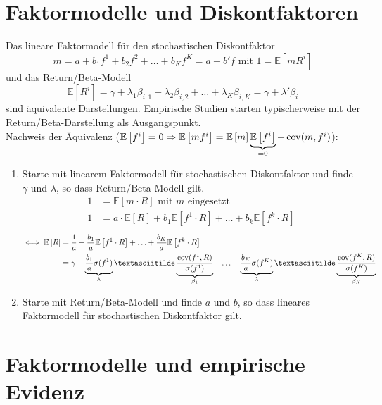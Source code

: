 \documentclass[12pt]{extreport} %
\theoremstyle{named}
\theoremstyle{nnamed}
\theoremstyle{itshape}
\theoremstyle{normal}
\begin{document}
\section{Faktormodelle und Diskontfaktoren}

Das lineare Faktormodell für den stochastischen Diskontfaktor
	$$ m = a + b_1 f^1 + b_2 f^2 + \dotsc + b_K f^K = a + b'f \text{ mit } 1 = \mathbb{E}[m R^i] $$
und das Return/Beta-Modell
	$$ \mathbb{E}[R^i] = \gamma + \lambda_1 \beta_{i, 1} + \lambda_2 \beta_{i, 2} + \dotsc + \lambda_K \beta_{i, K} = \gamma + \lambda' \beta_i $$
sind äquivalente Darstellungen. Empirische Studien starten typischerweise mit der Return/Beta-Darstellung als Ausgangspunkt. ~\\

Nachweis der Äquivalenz ($\mathbb{E}\left[ f^i \right] = 0 \Rightarrow \mathbb{E}\left[ m f^i\right] = \mathbb{E}\left[ m \right] \underbrace{\mathbb{E}\left[ f^i \right]}_{= 0} + \operatorname{cov}(m, f^i)$):
\begin{enumerate}
	\item Starte mit linearem Faktormodell für stochastischen Diskontfaktor und finde $\gamma$ und $\lambda$, so dass Return/Beta-Modell gilt.
		\begin{align*}
			1 &= \mathbb{E}\left[ m \cdot R \right] \text{ mit $m$ eingesetzt} \\
			1 & = a \cdot \mathbb{E}\left[ R \right] + b_1 \mathbb{E}\left[ f^1 \cdot R \right] + \dotsc + b_k \mathbb{E}\left[ f^k \cdot R \right]
		\end{align*}
		\begin{align*}
			 \iff \mathbb{E}\left[ R \right] & = \frac{1}{a} - \frac{b_1}{a} \mathbb{E}\left[ f^1 \cdot R \right] + \dotsc + \frac{b_K}{a} \mathbb{E}\left[ f^k \cdot R \right] \\
			 & = \gamma - \underbrace{\frac{b_1}{a} \var(f^1)}_{\lambda} ˜\underbrace{\frac{\cov(f^1, R)}{\var(f^1)}}_{\beta_1} - \dotsc - \underbrace{\frac{b_K}{a} \var(f^K)}_{\lambda} ˜\underbrace{\frac{\cov(f^K, R)}{\var(f^K)}}_{\beta_K} 
		\end{align*}
	\item Starte mit Return/Beta-Modell und finde $a$ und $b$, so dass lineares Faktormodell für stochastischen Diskontfaktor gilt. %
\end{enumerate}

\section{Faktormodelle und empirische Evidenz}
\end{document}
